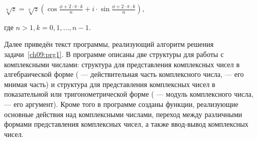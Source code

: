  $\sqrt[n]z=\sqrt[n]z(\cos \frac{\phi+2\cdot \pi \cdot k}{n}+i\cdot \sin \frac{\phi+2\cdot \pi \cdot k}{n})$,

где  $n>1,k=0,1,\dots,n-1$.

Далее приведён текст программы, реализующий алгоритм решения задачи~\ref{ch09:prg1}. В программе описаны две структуры для
работы с комплексными числами: структура  для представления комплексных чисел в
алгебраической форме ( --- действительная часть комплексного числа,  --- его
мнимая часть) и структура  для представления комплексных чисел в показательной или
тригонометрической форме ( --- модуль комплексного числа,  --- его
аргумент). Кроме того в программе созданы функции, реализующие основные действия над комплексными числами, переход
между различными формами представления комплексных чисел, а также ввод-вывод комплексных чисел. 

